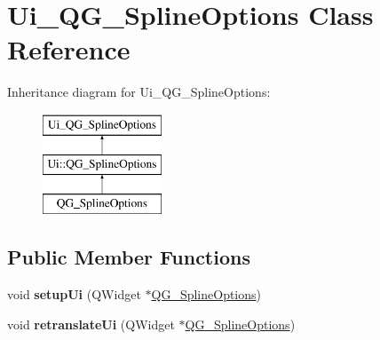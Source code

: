 \hypertarget{classUi__QG__SplineOptions}{\section{Ui\-\_\-\-Q\-G\-\_\-\-Spline\-Options Class Reference}
\label{classUi__QG__SplineOptions}
}
Inheritance diagram for Ui\-\_\-\-Q\-G\-\_\-\-Spline\-Options\-:\begin{figure}[H]
\begin{center}
\leavevmode
\includegraphics[height=3.000000cm]{classUi__QG__SplineOptions}
\end{center}
\end{figure}
\subsection*{Public Member Functions}
\begin{DoxyCompactItemize}
\item 
\hypertarget{classUi__QG__SplineOptions_ad8e879b91c317e650ea59b44ab0d727a}{void {\bfseries setup\-Ui} (Q\-Widget $\ast$\hyperlink{classQG__SplineOptions}{Q\-G\-\_\-\-Spline\-Options})}\label{classUi__QG__SplineOptions_ad8e879b91c317e650ea59b44ab0d727a}

\item 
\hypertarget{classUi__QG__SplineOptions_adedd3c1b98dca3ee1c4d14b5f6b1afa4}{void {\bfseries retranslate\-Ui} (Q\-Widget $\ast$\hyperlink{classQG__SplineOptions}{Q\-G\-\_\-\-Spline\-Options})}\label{classUi__QG__SplineOptions_adedd3c1b98dca3ee1c4d14b5f6b1afa4}

\end{DoxyCompactItemize}
